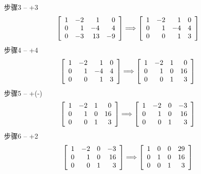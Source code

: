 \documentclass[UTF8,fontset=ubuntu]{ctexart}
\theoremstyle{nonumberplain}
\theoremstyle{break}
\theoremstyle{empty}
\begin{document}
步骤3 -- +3
\[\left[\begin{array}{r r r r}
    1 & -2 & 1 & 0\\
    0 & 1 & -4 & 4\\
    0 & -3 & 13 & -9
\end{array}\right] \Longrightarrow \left[\begin{array}{r r r r}
	1 & -2 & 1 & 0\\
	0 & 1 & -4 & 4\\
	0 & 0 & 1 & 3
\end{array}\right]\]
步骤4 -- +4
\[\left[\begin{array}{r r r r}
    1 & -2 & 1 & 0\\
    0 & 1 & -4 & 4\\
    0 & 0 & 1 & 3
\end{array}\right] \Longrightarrow \left[\begin{array}{r r r r}
	1 & -2 & 1 & 0\\
	0 & 1 & 0 & 16\\
	0 & 0 & 1 & 3
\end{array}\right]\]
步骤5 -- +(-)
\[\left[\begin{array}{r r r r}
    1 & -2 & 1 & 0\\
    0 & 1 & 0 & 16\\
    0 & 0 & 1 & 3
\end{array}\right] \Longrightarrow \left[\begin{array}{r r r r}
	1 & -2 & 0 & -3\\
	0 & 1 & 0 & 16\\
	0 & 0 & 1 & 3
\end{array}\right]\]
步骤6 -- +2
\[\left[\begin{array}{r r r r}
    1 & -2 & 0 & -3\\
    0 & 1 & 0 & 16\\
    0 & 0 & 1 & 3
\end{array}\right] \Longrightarrow \left[\begin{array}{r r r r}
	1 & 0 & 0 & 29\\
	0 & 1 & 0 & 16\\
	0 & 0 & 1 & 3
\end{array}\right]\]
\vspace{6ex}
\end{document}
